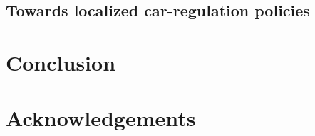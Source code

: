 \documentclass[3p,times,procedia]{elsarticle}
\begin{document}
\subsection{Towards localized car-regulation policies}




\section{Conclusion}




\section*{Acknowledgements}











%


\clearpage
\end{document}
